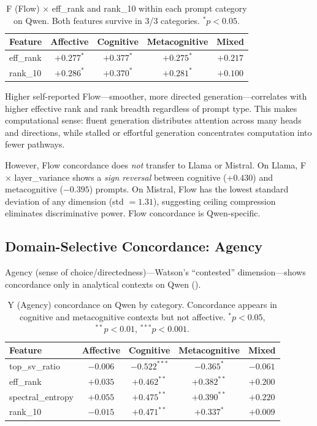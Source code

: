 \documentclass[11pt,a4paper]{article}
\begin{document}
\begin{table}[H]
\centering
\caption{F (Flow) $\times$ eff\_rank and rank\_10 within each prompt category on Qwen. Both features survive in 3/3 categories. $^*p < 0.05$.}
\label{tab:flow}
\begin{tabular}{lcccc}
\toprule
\textbf{Feature} & \textbf{Affective} & \textbf{Cognitive} & \textbf{Metacognitive} & \textbf{Mixed} \\
\midrule
eff\_rank  & $+0.277^*$ & $+0.377^*$ & $+0.275^*$ & $+0.217$ \\
rank\_10   & $+0.286^*$ & $+0.370^*$ & $+0.281^*$ & $+0.100$ \\
\bottomrule
\end{tabular}
\end{table}

Higher self-reported Flow---smoother, more directed generation---correlates with higher effective rank and rank breadth regardless of prompt type. This makes computational sense: fluent generation distributes attention across many heads and directions, while stalled or effortful generation concentrates computation into fewer pathways.

However, Flow concordance does \emph{not} transfer to Llama or Mistral. On Llama, F $\times$ layer\_variance shows a \emph{sign reversal} between cognitive ($+0.430$) and metacognitive ($-0.395$) prompts. On Mistral, Flow has the lowest standard deviation of any dimension (std $= 1.31$), suggesting ceiling compression eliminates discriminative power. Flow concordance is Qwen-specific.

\subsection{Domain-Selective Concordance: Agency}
\label{sec:agency}

Agency (sense of choice/directedness)---Watson's ``contested'' dimension---shows concordance only in analytical contexts on Qwen ().

\begin{table}[H]
\centering
\caption{Y (Agency) concordance on Qwen by category. Concordance appears in cognitive and metacognitive contexts but not affective. $^*p < 0.05$, $^{**}p < 0.01$, $^{***}p < 0.001$.}
\label{tab:agency}
\begin{tabular}{lcccc}
\toprule
\textbf{Feature} & \textbf{Affective} & \textbf{Cognitive} & \textbf{Metacognitive} & \textbf{Mixed} \\
\midrule
top\_sv\_ratio      & $-0.006$ & $-0.522^{***}$ & $-0.365^*$   & $-0.061$ \\
eff\_rank           & $+0.035$ & $+0.462^{**}$  & $+0.382^{**}$ & $+0.200$ \\
spectral\_entropy   & $+0.055$ & $+0.475^{**}$  & $+0.390^{**}$ & $+0.220$ \\
rank\_10            & $-0.015$ & $+0.471^{**}$  & $+0.337^*$   & $+0.009$ \\
\bottomrule
\end{tabular}
\end{table}
\end{document}
